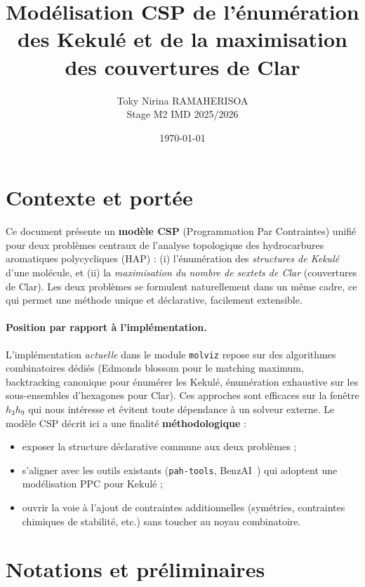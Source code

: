 \documentclass[a4paper,11pt]{article}
\title{Mod\'elisation CSP de l'\'enum\'eration des Kekul\'e et de la maximisation des couvertures de Clar}
\author{Toky Nirina RAMAHERISOA \\ \small{Stage M2 IMD \textendash{} 2025/2026}}
\date{\today}
\begin{document}
\maketitle

\section{Contexte et port\'ee}

Ce document pr\'esente un \textbf{mod\`ele CSP} (Programmation Par Contraintes) unifi\'e
pour deux probl\`emes centraux de l'analyse topologique des hydrocarbures aromatiques polycycliques
(HAP) : (i) l'\'enum\'eration des \emph{structures de Kekul\'e} d'une mol\'ecule, et (ii) la
\emph{maximisation du nombre de sextets de Clar} (couvertures de Clar). Les deux probl\`emes se
formulent naturellement dans un m\^eme cadre, ce qui permet une m\'ethode unique et d\'eclarative,
facilement extensible.

\paragraph{Position par rapport \`a l'impl\'ementation.}
L'impl\'ementation \emph{actuelle} dans le module \texttt{molviz} repose sur des algorithmes
combinatoires d\'edi\'es (Edmonds blossom pour le matching maximum, backtracking canonique pour
\'enum\'erer les Kekul\'e, \'enum\'eration exhaustive sur les sous-ensembles d'hexagones pour
Clar). Ces approches sont efficaces sur la fen\^etre $h_3$\textendash{}$h_9$ qui nous int\'eresse
et \'evitent toute d\'ependance \`a un solveur externe. Le mod\`ele CSP d\'ecrit ici a une
finalit\'e \textbf{m\'ethodologique} :
\begin{itemize}
  \item exposer la structure d\'eclarative commune aux deux probl\`emes ;
  \item s'aligner avec les outils existants (\texttt{pah-tools}, BenzAI~\cite{varet2023benzai})
    qui adoptent une mod\'elisation PPC pour Kekul\'e ;
  \item ouvrir la voie \`a l'ajout de contraintes additionnelles (sym\'etries, contraintes
    chimiques de stabilit\'e, etc.) sans toucher au noyau combinatoire.
\end{itemize}

\section{Notations et pr\'eliminaires}
\end{document}

